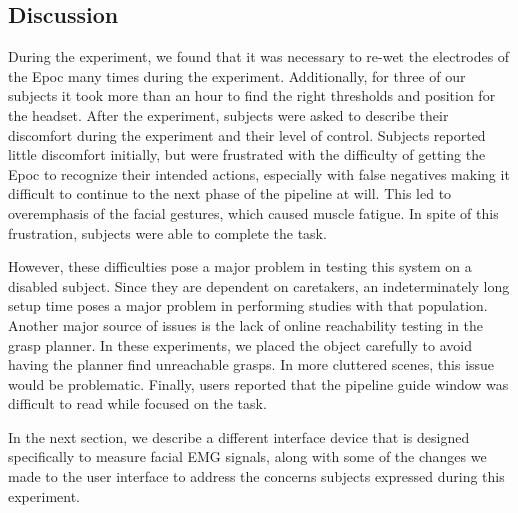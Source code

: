 \subsection{Discussion}
During the experiment, we found that it was necessary to re-wet the electrodes of the Epoc many times during the experiment. Additionally, for three of our subjects it took more than an hour to find the right thresholds and position for the headset. After the experiment, subjects were asked to describe their discomfort during the experiment and their level of control. Subjects reported little discomfort initially, but were frustrated with the difficulty of getting the Epoc to recognize their intended actions, especially with false negatives making it difficult to continue to the next phase of the pipeline at will. This led to overemphasis of the facial gestures, which caused muscle fatigue. In spite of this frustration, subjects were able to complete the task. 

However, these difficulties pose a major problem in testing this system on a disabled subject. Since they are dependent on caretakers, an indeterminately long setup time poses a major problem in performing studies with that population. Another major source of issues is the lack of online reachability testing in the grasp planner. In these experiments, we placed the object carefully to avoid having the planner find unreachable grasps. In more cluttered scenes, this issue would be problematic. Finally, users reported that the pipeline guide window was difficult to read while focused on the task.

In the next section, we describe a different interface device that is designed specifically to measure facial EMG signals, along with some of the changes we made to the user interface to address the concerns subjects expressed during this experiment.
